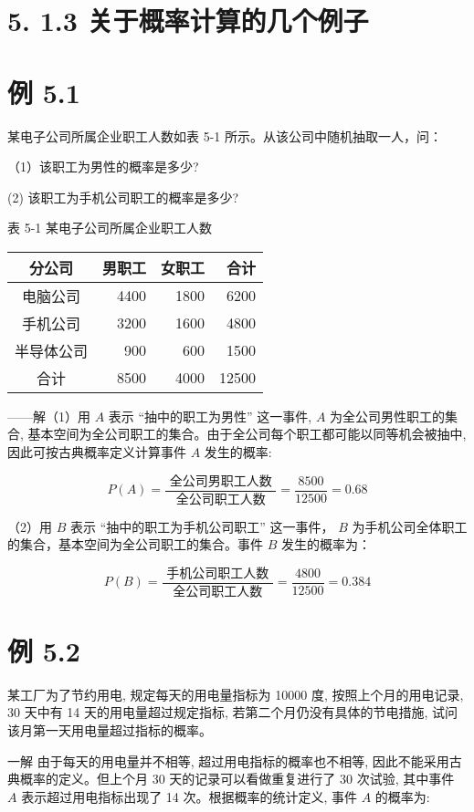 \documentclass[10pt]{article}
\begin{document}
\begin{CJK*}{UTF8}{bsmi}
\section*{5. 1.3 关于概率计算的几个例子}
\section*{例 5.1}
某电子公司所属企业职工人数如表 5-1 所示。从该公司中随机抽取一人，问：

（1）该职工为男性的概率是多少?

(2) 该职工为手机公司职工的概率是多少?

表 5-1 某电子公司所属企业职工人数

\begin{center}
\begin{tabular}{crrr}
\hline
分公司 & 男职工 & 女职工 & 合计 \\
\hline
电脑公司 & 4400 & 1800 & 6200 \\
手机公司 & 3200 & 1600 & 4800 \\
半导体公司 & 900 & 600 & 1500 \\
\hline
合计 & 8500 & 4000 & 12500 \\
\hline
\end{tabular}
\end{center}

——解（1）用 $A$ 表示 “抽中的职工为男性” 这一事件, $A$ 为全公司男性职工的集合, 基本空间为全公司职工的集合。由于全公司每个职工都可能以同等机会被抽中, 因此可按古典概率定义计算事件 $A$ 发生的概率:

$$
P(A)=\frac{\text { 全公司男职工人数 }}{\text { 全公司职工人数 }}=\frac{8500}{12500}=0.68
$$

（2）用 $B$ 表示 “抽中的职工为手机公司职工” 这一事件， $B$ 为手机公司全体职工的集合，基本空间为全公司职工的集合。事件 $B$ 发生的概率为：

$$
P(B)=\frac{\text { 手机公司职工人数 }}{\text { 全公司职工人数 }}=\frac{4800}{12500}=0.384
$$

\section*{例 5.2}
某工厂为了节约用电, 规定每天的用电量指标为 10000 度, 按照上个月的用电记录, 30 天中有 14 天的用电量超过规定指标, 若第二个月仍没有具体的节电措施, 试问该月第一天用电量超过指标的概率。

一解 由于每天的用电量并不相等, 超过用电指标的概率也不相等, 因此不能采用古典概率的定义。但上个月 30 天的记录可以看做重复进行了 30 次试验, 其中事件 $A$ 表示超过用电指标出现了 14 次。根据概率的统计定义, 事件 $A$ 的概率为:


\end{CJK*}
\end{document}

